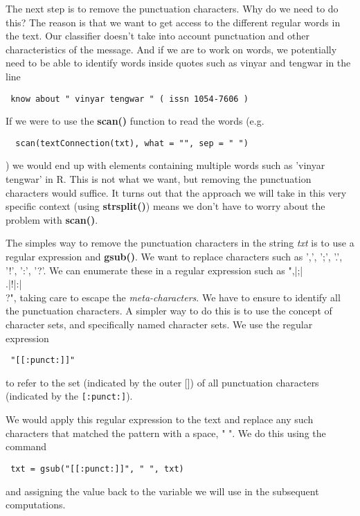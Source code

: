 \documentclass{article}
\def\SFunction#1{\textbf{#1()}}
\def\SVariable#1{\textsl{#1}}
\begin{document}
The next step is to remove the punctuation characters.  Why do we need
to do this?  The reason is that we want to get access to the different
regular words in the text.  Our classifier doesn't take into account
punctuation and other characteristics of the message.
And if we are to work on words, we potentially need to 
be able to identify words
inside quotes such as vinyar and tengwar in the line
\begin{verbatim}
 know about " vinyar tengwar " ( issn 1054-7606 )
\end{verbatim}
If we were to use the 
\SFunction{scan} function to read the words
(e.g.
\begin{verbatim}
  scan(textConnection(txt), what = "", sep = " ")
\end{verbatim}
) we would end up with elements containing multiple words such as
'vinyar tengwar' in R.  This is not what we want, but removing the
punctuation characters would suffice.  It turns out that the approach
we will take in this very specific context (using
\SFunction{strsplit}) means we don't have to worry about the problem
with \SFunction{scan}.

The simples way to remove the punctuation characters in the string
\SVariable{txt} is to use a regular expression and \SFunction{gsub}.
We want to replace characters such as ',', ';', '.', '!', ':', '?'.
We can enumerate these in a regular expression such as
",|;|\\.|!|:|\\?", taking care to escape the \textit{meta-characters}.
We have to ensure to identify all the punctuation characters.  A
simpler way to do this is to use the concept of character sets, and
specifically named character sets.
We use the regular expression
\begin{verbatim}
 "[[:punct:]]"
\end{verbatim}
to refer to the set (indicated by the outer []) of all punctuation
characters (indicated by the \verb+[:punct:]+).

We would apply this regular expression to the text and replace any
such characters that matched the pattern with a space, " ".
We do this using the command
\begin{verbatim}
 txt = gsub("[[:punct:]]", " ", txt)
\end{verbatim}
and assigning the value back to the variable we will
use in the subsequent computations.
\end{document}
